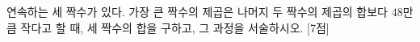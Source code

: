연속하는 세 짝수가 있다. 가장 큰 짝수의 제곱은 나머지 두 짝수의 제곱의 합보다 $48$만큼 작다고 할 때, 세 짝수의 합을 구하고, 그 과정을 서술하시오. \mbox{[7점]}
